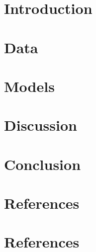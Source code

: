 \documentclass[12pt]{article}
\begin{document}
\pagebreak

\setcounter{page}{1}
\thispagestyle{empty}
\tableofcontents
\listoffigures
\pagebreak
\setcounter{page}{1}


\pagebreak
\section{Introduction}


\section{Data}


\section{Models}



\section{Discussion}
\section{Conclusion}
\section{References}
\appendix



\pagebreak
\nocite{NOCITE1}
\nocite{NOCITE2}
\section{References}
\printbibliography[heading=none]
\end{document}
